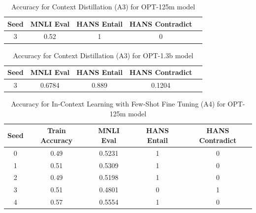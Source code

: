 \documentclass[10pt,twocolumn,letterpaper]{article}
\begin{document}
			
			
			
			
			
			

\begin{table}[h!]
\begin{center}
\begin{tabular}{|c|c|c|c|c|}
\hline
\textbf{Seed} & \textbf{MNLI Eval} & \textbf{HANS Entail} & \textbf{HANS Contradict} \\
\hline
\hline
3 & 0.52 & 1 & 0 \\
\hline
\end{tabular}
\end{center}
\caption{Accuracy for Context Distillation (A3) for OPT-125m model}
\end{table}

\begin{table}[h!]
\begin{center}
\begin{tabular}{|c|c|c|c|c|}
\hline
\textbf{Seed} & \textbf{MNLI Eval} & \textbf{HANS Entail} & \textbf{HANS Contradict} \\
\hline
\hline
3 & 0.6784 & 0.889 & 0.1204 \\
\hline
\end{tabular}
\end{center}
\caption{Accuracy for Context Distillation (A3) for OPT-1.3b model}
\end{table}

				
				

\begin{table}[h!]
\begin{center}
\begin{tabular}{|c|c|c|c|c|}
\hline
\textbf{Seed} & \textbf{Train Accuracy} & \textbf{MNLI Eval} & \textbf{HANS Entail} & \textbf{HANS Contradict} \\
\hline
\hline
0 & 0.49 & 0.5231 & 1 & 0 \\
1 & 0.51 & 0.5309 & 1 & 0 \\
2 & 0.49 & 0.5198 & 1 & 0 \\
3 & 0.51 & 0.4801 & 0 & 1 \\
4 & 0.57 & 0.5554 & 1 & 0 \\
\hline
\end{tabular}
\end{center}
\caption{Accuracy for In-Context Learning with Few-Shot Fine Tuning (A4) for OPT-125m model}
\end{table}
\end{document}
